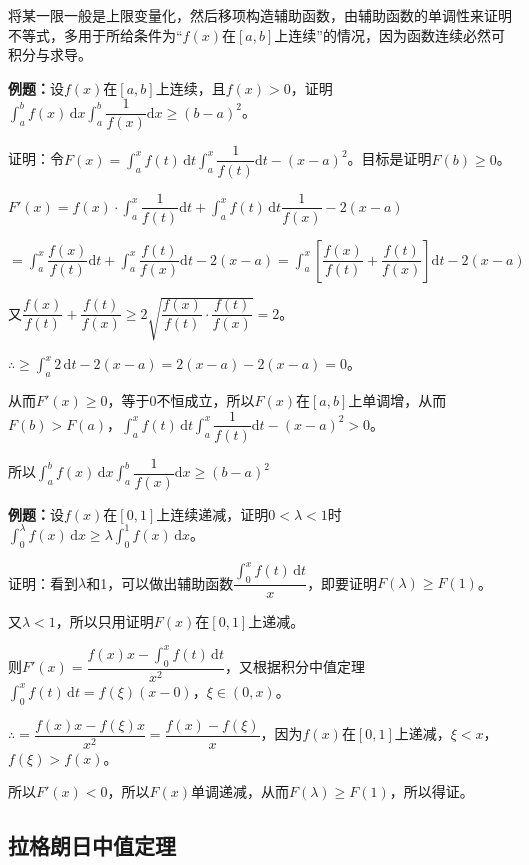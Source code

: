 \documentclass[UTF8, 12pt]{ctexart}
\begin{document}
将某一限一般是上限变量化，然后移项构造辅助函数，由辅助函数的单调性来证明不等式，多用于所给条件为“$f(x)$在$[a,b]$上连续”的情况，因为函数连续必然可积分与求导。

\textbf{例题：}设$f(x)$在$[a,b]$上连续，且$f(x)>0$，证明$\displaystyle{\int_a^bf(x)\,\textrm{d}x\int_a^b\dfrac{1}{f(x)}\textrm{d}x}\geqslant(b-a)^2$。

证明：令$F(x)=\displaystyle{\int_a^xf(t)\,\textrm{d}t\int_a^x\dfrac{1}{f(t)}\textrm{d}t-(x-a)^2}$。目标是证明$F(b)\geqslant0$。

$F'(x)=f(x)\cdot\displaystyle{\int_a^x\dfrac{1}{f(t)}\textrm{d}t+\int_a^xf(t)\,\textrm{d}t\dfrac{1}{f(x)}}-2(x-a)$

$=\displaystyle{\int_a^x\dfrac{f(x)}{f(t)}\textrm{d}t+\int_a^x\dfrac{f(t)}{f(x)}\textrm{d}t-2(x-a)=\int_a^x\left[\dfrac{f(x)}{f(t)}+\dfrac{f(t)}{f(x)}\right]\textrm{d}t-2(x-a)}$

又$\dfrac{f(x)}{f(t)}+\dfrac{f(t)}{f(x)}\geqslant2\sqrt{\dfrac{f(x)}{f(t)}\cdot\dfrac{f(t)}{f(x)}}=2$。

$\therefore\geqslant\int_a^x2\,\textrm{d}t-2(x-a)=2(x-a)-2(x-a)=0$。

从而$F'(x)\geqslant0$，等于0不恒成立，所以$F(x)$在$[a,b]$上单调增，从而$F(b)>F(a)$，$\displaystyle{\int_a^xf(t)\,\textrm{d}t\int_a^x\dfrac{1}{f(t)}\textrm{d}t-(x-a)^2}>0$。

所以$\displaystyle{\int_a^bf(x)\,\textrm{d}x\int_a^b\dfrac{1}{f(x)}\textrm{d}x}\geqslant(b-a)^2$

\textbf{例题：}设$f(x)$在$[0,1]$上连续递减，证明$0<\lambda<1$时$\int_0^\lambda f(x)\,\textrm{d}x\geqslant\lambda\int_0^1f(x)\,\textrm{d}x$。

证明：看到$\lambda$和1，可以做出辅助函数$\dfrac{\int_0^xf(t)\,\textrm{d}t}{x}$，即要证明$F(\lambda)\geqslant F(1)$。

又$\lambda<1$，所以只用证明$F(x)$在$[0,1]$上递减。

则$F'(x)=\dfrac{f(x)x-\int_0^xf(t)\,\textrm{d}t}{x^2}$，又根据积分中值定理$\int_0^xf(t)\,\textrm{d}t=f(\xi)(x-0)$，$\xi\in(0,x)$。

$\therefore=\dfrac{f(x)x-f(\xi)x}{x^2}=\dfrac{f(x)-f(\xi)}{x}$，因为$f(x)$在$[0,1]$上递减，$\xi<x$，$f(\xi)>f(x)$。

所以$F'(x)<0$，所以$F(x)$单调递减，从而$F(\lambda)\geqslant F(1)$，所以得证。

\subsection{拉格朗日中值定理}
\end{document}
